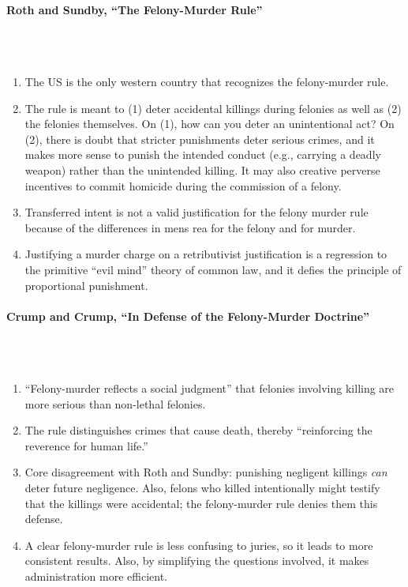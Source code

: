 \paragraph{Roth and Sundby, ``The Felony-Murder Rule''}
~\\\\
\begin{enumerate}
    \item The US is the only western country that recognizes the felony-murder 
    rule.
    \item The rule is meant to (1) deter accidental killings during felonies 
    as well as (2) the felonies themselves. On (1), how can you deter an 
    unintentional act? On (2), there is doubt that stricter punishments deter 
    serious crimes, and it makes more sense to punish the intended conduct 
    (e.g., carrying a deadly weapon) rather than the unintended killing. It 
    may also creative perverse incentives to commit homicide during the 
    commission of a felony.
    \item Transferred intent is not a valid justification for the felony 
    murder rule because of the differences in mens rea for the felony 
    and for murder.
    \item Justifying a murder charge on a retributivist justification is a 
    regression to the primitive ``evil mind'' theory of common law, and it 
    defies the principle of proportional punishment.
\end{enumerate}

\paragraph{Crump and Crump, ``In Defense of the Felony-Murder Doctrine''}
~\\\\
\begin{enumerate}
    \item ``Felony-murder reflects a social judgment'' that felonies involving 
    killing are more serious than non-lethal felonies.
    \item The rule distinguishes crimes that cause death, thereby 
    ``reinforcing the reverence for human life.''
    \item Core disagreement with Roth and Sundby: punishing negligent killings 
    \emph{can} deter future negligence. Also, felons who killed intentionally 
    might testify that the killings were accidental; the felony-murder rule 
    denies them this defense.
    \item A clear felony-murder rule is less confusing to juries, so it leads 
    to more consistent results. Also, by simplifying the questions involved, 
    it makes administration more efficient.
\end{enumerate}

